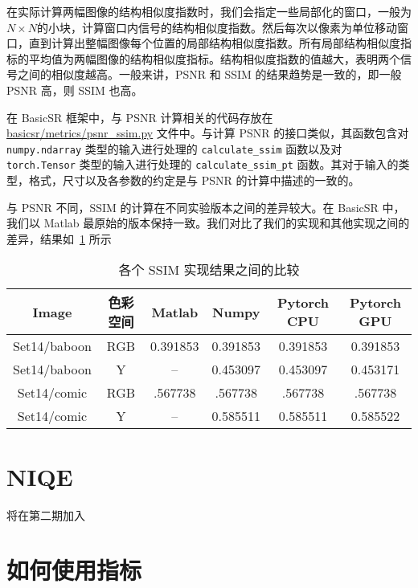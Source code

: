 \documentclass[../main.tex]{subfiles}
\begin{document}
在实际计算两幅图像的结构相似度指数时，我们会指定一些局部化的窗口，一般为$N\times N$的小块，计算窗口内信号的结构相似度指数。然后每次以像素为单位移动窗口，直到计算出整幅图像每个位置的局部结构相似度指数。所有局部结构相似度指标的平均值为两幅图像的结构相似度指标。结构相似度指数的值越大，表明两个信号之间的相似度越高。一般来讲，PSNR 和 SSIM 的结果趋势是一致的，即一般 PSNR 高，则 SSIM 也高。

在 BasicSR 框架中，与 PSNR 计算相关的代码存放在 \href{https://github.com/XPixelGroup/BasicSR/blob/master/basicsr/metrics/psnr_ssim.py#L12}{basicsr/metrics/psnr\_ssim.py} 文件中。与计算 PSNR 的接口类似，其函数包含对 \texttt{numpy.ndarray} 类型的输入进行处理的 \texttt{calculate\_ssim} 函数以及对 \texttt{torch.Tensor} 类型的输入进行处理的 \texttt{calculate\_ssim\_pt} 函数。其对于输入的类型，格式，尺寸以及各参数的约定是与 PSNR 的计算中描述的一致的。

与 PSNR 不同，SSIM 的计算在不同实验版本之间的差异较大。在 BasicSR 中，我们以 Matlab 最原始的版本保持一致。我们对比了我们的实现和其他实现之间的差异，结果如\tablename~\ref{tab:psnr} 所示

\begin{table}[]
    \centering
    \begin{tabular}{c|c|c|c|c|c}
    \toprule
        Image & 色彩空间 & Matlab & Numpy & Pytorch CPU & Pytorch GPU \\
        \midrule
        Set14/baboon & RGB & 0.391853 & 0.391853 & 0.391853 & 0.391853 \\
        Set14/baboon & Y & -- & 0.453097 & 0.453097 & 0.453171\\
        Set14/comic & RGB & .567738& .567738&.567738	&.567738\\
Set14/comic&Y&--&0.585511&0.585511&0.585522\\
\bottomrule
    \end{tabular}
    \caption{各个 SSIM 实现结果之间的比较}
    \label{tab:psnr}
\end{table}

\section{NIQE}

将在第二期加入

\section{如何使用指标}
\end{document}
